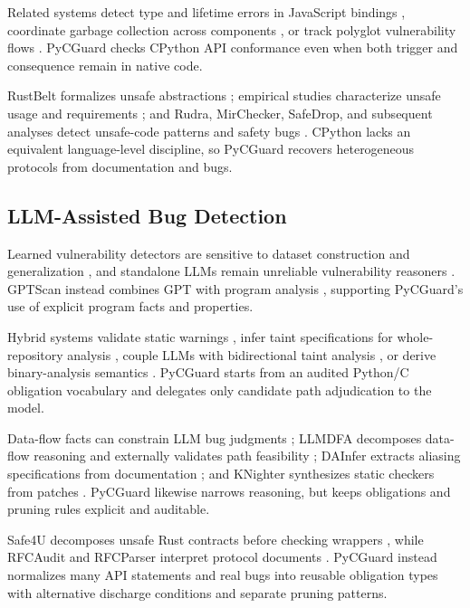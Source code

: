 Related systems detect type and lifetime errors in JavaScript bindings
\cite{brown2017jsbindings}, coordinate garbage collection across components
\cite{degenbaev2018crosscomponentgc}, or track polyglot vulnerability flows
\cite{charon2025}. PyCGuard checks CPython API conformance even when both trigger
and consequence remain in native code.

RustBelt formalizes unsafe abstractions \cite{rustbelt2018}; empirical studies
characterize unsafe usage and requirements
\cite{unsaferustoopsla2020,rustsafetypldi2020,unsafeachilles2024}; and Rudra,
MirChecker, SafeDrop, and subsequent analyses detect unsafe-code patterns and
safety bugs \cite{rudra2021,mirchecker2021,safedrop2023,rustsafetytse2024,dontpanic2025}.
CPython lacks an equivalent language-level discipline, so PyCGuard recovers
heterogeneous protocols from documentation and bugs.

\subsection{LLM-Assisted Bug Detection}

Learned vulnerability detectors are sensitive to dataset construction and
generalization \cite{chakraborty2022deepvuln,steenhoek2023vuln}, and standalone
LLMs remain unreliable vulnerability reasoners \cite{ullah2024llmvuln}.
GPTScan instead combines GPT with program analysis \cite{gptscan2024}, supporting
PyCGuard's use of explicit program facts and properties.

Hybrid systems validate static warnings \cite{li2024llmstatic}, infer taint
specifications for whole-repository analysis \cite{iris2025}, couple LLMs with
bidirectional taint analysis \cite{staint2025}, or derive binary-analysis
semantics \cite{latte2025}. PyCGuard starts from an audited Python/C obligation
vocabulary and delegates only candidate path adjudication to the model.

Data-flow facts can constrain LLM bug judgments \cite{wang2024dataflowbug};
LLMDFA decomposes data-flow reasoning and externally validates path feasibility
\cite{llmdfa2024}; DAInfer extracts aliasing specifications from documentation
\cite{dainfer2024}; and KNighter synthesizes static checkers from patches
\cite{knighter2025}. PyCGuard likewise narrows reasoning, but keeps obligations
and pruning rules explicit and auditable.

Safe4U decomposes unsafe Rust contracts before checking wrappers
\cite{safe4u2025}, while RFCAudit and RFCParser interpret protocol documents
\cite{rfcaudit2025,rfcparser2025}. PyCGuard instead normalizes many API statements
and real bugs into reusable obligation types with alternative discharge
conditions and separate pruning patterns.
